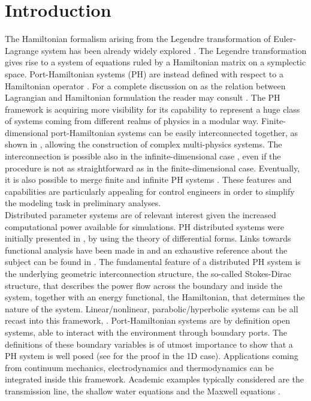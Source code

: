 \documentclass[preprint,12pt]{elsarticle}
\newcommand{\secondReviewer}[1]{\textcolor{blue!80!black}{#1}}
\begin{document}
	\section*{Introduction}
	 The Hamiltonian formalism arising from the Legendre transformation of Euler-Lagrange system  has been already widely explored \cite{SymplecticElasticity}. The Legendre transformation gives rise to a system of equations ruled by a Hamiltonian matrix on a symplectic space. Port-Hamiltonian systems (PH) are instead defined with respect to a \secondReviewer{Hamiltonian operator \cite[Chapter~7]{Olver}. For a complete discussion on as the relation between Lagrangian and Hamiltonian formulation the reader may consult \cite{MardsenDiraclAG_I, MardsenDiraclAG_II}.} The PH framework is acquiring more visibility for its capability to represent a huge class of systems coming from different realms of physics in a modular way. Finite-dimensional port-Hamiltonian systems can be easily interconnected together, as shown in \cite{Cervera2007}, allowing the construction of complex multi-physics systems. The interconnection is possible also in the infinite-dimensional case \cite{ShaftIntInfinite}, even if the procedure is not as straightforward as in the finite-dimensional case. Eventually, it is also possible to merge finite and infinite PH systems \cite{vanderShaftintFinInf}. These features and capabilities are particularly appealing for control engineers in order to simplify the modeling task in preliminary analyses.  \\
	
	
	Distributed parameter systems are of relevant interest given the increased computational power available for simulations. PH distributed systems were initially presented in \cite{VANDERSCHAFT2002166}, by using the theory of differential forms. Links towards functional analysis have been made in \cite{Villegas} and an exhaustive reference about the subject can be found in \cite{BookZwart}. The fundamental feature of a distributed PH system is the underlying geometric interconnection structure, the so-called Stokes-Dirac structure, that describes the power flow across the boundary and inside the system, together with an energy functional, the Hamiltonian, that determines the nature of the system. Linear/nonlinear, parabolic/hyperbolic systems can be all recast into this framework, \cite{bookPHs}. Port-Hamiltonian systems are by definition open systems, able to interact with the environment through boundary ports. The definitions of these boundary variables is of utmost importance to show that a PH system is well posed (see \cite{LeGorrec2005} for the proof in the 1D case). Applications coming from continuum mechanics, electrodynamics and thermodynamics can be integrated inside this framework. Academic examples typically considered are the transmission line, the shallow water equations and the Maxwell equations \cite{VANDERSCHAFT2002166}. \\
	
\end{document}
